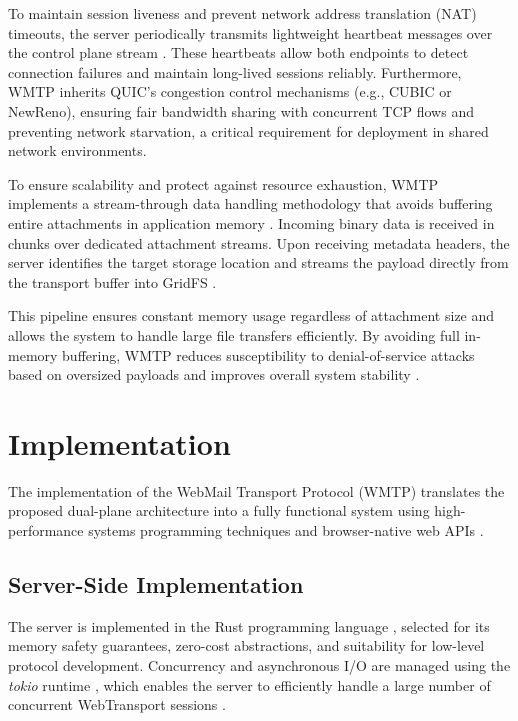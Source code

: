 \documentclass[10pt,a4paper]{article}
\begin{document}
To maintain session liveness and prevent network address
translation (NAT) timeouts, the server periodically transmits
lightweight heartbeat messages over the control plane stream
\cite{webtransport}. These heartbeats allow both endpoints to
detect connection failures and maintain long-lived sessions
reliably. Furthermore, WMTP inherits QUIC's congestion control mechanisms (e.g., CUBIC or NewReno), ensuring fair bandwidth sharing with concurrent TCP flows and preventing network starvation, a critical requirement for deployment in shared network environments.

To ensure scalability and protect against resource exhaustion,
WMTP implements a stream-through data handling methodology
that avoids buffering entire attachments in application memory
\cite{gridfs2024}. Incoming binary data is received in chunks over
dedicated attachment streams. Upon receiving metadata
headers, the server identifies the target storage location and
streams the payload directly from the transport buffer into
GridFS \cite{mongodb2024, gridfs2024}.

This pipeline ensures constant memory usage regardless of
attachment size and allows the system to handle large file
transfers efficiently. By avoiding full in-memory buffering,
WMTP reduces susceptibility to denial-of-service attacks based
on oversized payloads and improves overall system stability
\cite{rustasync}.

\vspace{12pt}
\section{Implementation}

The implementation of the WebMail Transport Protocol
(WMTP) translates the proposed dual-plane architecture into
a fully functional system using high-performance systems
programming techniques and browser-native web APIs
\cite{klabnik2019, rustasync, webtransport, quic}.

\subsection{Server-Side Implementation}

The server is implemented in the Rust programming
language \cite{klabnik2019}, selected for its memory safety guarantees,
zero-cost abstractions, and suitability for low-level protocol
development. Concurrency and asynchronous I/O are managed
using the \textit{tokio} runtime \cite{rustasync}, which enables the
server to efficiently handle a large number of concurrent
WebTransport sessions \cite{webtransport}.
\end{document}
